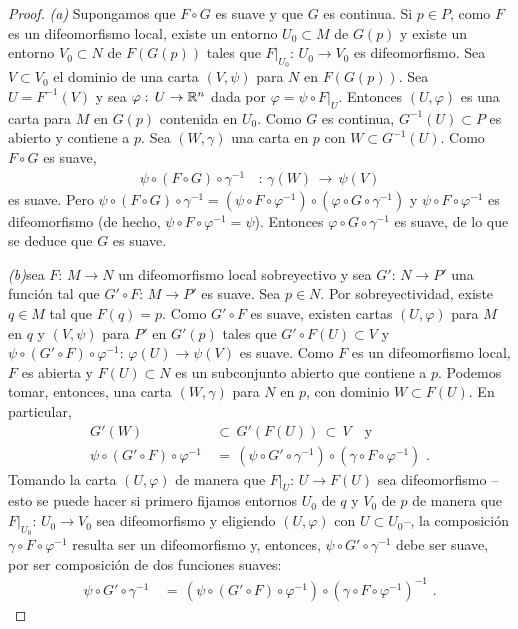 \begin{proof}
	\emph{(a)} Supongamos que $F\circ G$ es suave y que $G$ es continua.
	Si $p\in P$, como $F$ es un difeomorfismo local, existe un entorno
	$U_{0}\subset M$ de $G(p)$ y existe un entorno $V_{0}\subset N$ de
	$F(G(p))$ tales que $F|_{U_{0}}:\,U_{0}\rightarrow V_{0}$ es
	difeomorfismo. Sea $V\subset V_{0}$ el dominio de una carta $(V,\psi)$
	para $N$ en $F(G(p))$. Sea $U=F^{-1}(V)$ y sea
	$\varphi:\,U\rightarrow\mathbb{R}^{n}$ dada por $\varphi=\psi\circ F|_{U}$.
	Entonces $(U,\varphi)$ es una carta para $M$ en $G(p)$ contenida en
	$U_{0}$. Como $G$ es continua, $G^{-1}(U)\subset P$ es abierto y
	contiene a $p$. Sea $(W,\gamma)$ una carta en $p$ con
	$W\subset G^{-1}(U)$. Como $F\circ G$ es suave,
	\begin{align*}
		\psi\circ(F\circ G)\circ\gamma^{-1} & \,:\,\gamma(W)\,
			\rightarrow\,\psi(V)
	\end{align*}
	es suave. Pero $\psi\circ(F\circ G)\circ\gamma^{-1}=%
	(\psi\circ F\circ\varphi^{-1})\circ (\varphi\circ G\circ\gamma^{-1})$
	y $\psi\circ F\circ\varphi^{-1}$ es difeomorfismo (de hecho,
	$\psi\circ F\circ\varphi^{-1}=\psi$). Entonces
	$\varphi\circ G\circ\gamma^{-1}$ es suave, de lo que se deduce que
	$G$ es suave.

	\emph{(b)}sea $F:\,M\rightarrow N$ un difeomorfismo local
	sobreyectivo y sea $G':\,N\rightarrow P'$ una funci\'{o}n tal que
	$G'\circ F:\,M\rightarrow P'$ es suave. Sea $p\in N$. Por
	sobreyectividad, existe $q\in M$ tal que $F(q)=p$. Como
	$G'\circ F$ es suave, existen cartas $(U,\varphi)$ para $M$ en
	$q$ y $(V,\psi)$ para $P'$ en $G'(p)$ tales que
	$G'\circ F(U)\subset V$ y $\psi\circ (G'\circ F)\circ\varphi^{-1}:\,%
	\varphi(U)\rightarrow\psi(V)$ es suave. Como $F$ es un difeomorfismo
	local, $F$ es abierta y $F(U)\subset N$ es un subconjunto abierto
	que contiene a $p$. Podemos tomar, entonces, una carta $(W,\gamma)$
	para $N$ en $p$, con dominio $W\subset F(U)$. En particular,
	\begin{align*}
		G'(W) & \,\subset\,G'(F(U))\,\subset\, V\quad\text{y} \\
		\psi\circ(G'\circ F)\circ\varphi^{-1} & \,=\,
			(\psi\circ G'\circ\gamma^{-1})\circ
			(\gamma\circ F\circ\varphi^{-1})
		\text{ .}
	\end{align*}
	Tomando la carta $(U,\varphi)$ de manera que
	$F|_{U}:\,U\rightarrow F(U)$ sea difeomorfismo --esto se puede hacer
	si primero fijamos entornos $U_{0}$ de $q$ y $V_{0}$ de $p$ de manera
	que $F|_{U_{0}}:\,U_{0}\rightarrow V_{0}$ sea difeomorfismo y
	eligiendo $(U,\varphi)$ con $U\subset U_{0}$--, la composici\'{o}n
	$\gamma\circ F\circ\varphi^{-1}$ resulta ser un difeomorfismo y,
	entonces, $\psi\circ G'\circ\gamma^{-1}$ debe ser suave, por ser
	composici\'{o}n de dos funciones suaves:
	\begin{align*}
		\psi\circ G'\circ\gamma^{-1} & \,=\,
			(\psi\circ (G'\circ F)\circ\varphi^{-1})\circ
			(\gamma\circ F\circ\varphi^{-1})^{-1}
		\text{ .}
	\end{align*}
\end{proof}
